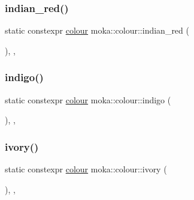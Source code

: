 \mbox{\label{classmoka_1_1colour_a808f0790d09569dfa2536ebc91a189c1}} 
\subsubsection{\texorpdfstring{indian\_red()}{indian\_red()}}
{\footnotesize\ttfamily static constexpr \mbox{\hyperlink{classmoka_1_1colour}{colour}} moka\+::colour\+::indian\+\_\+red (\begin{DoxyParamCaption}{ }\end{DoxyParamCaption})\hspace{0.3cm}{\ttfamily [inline]}, {\ttfamily [static]}, {\ttfamily [noexcept]}}

\mbox{\label{classmoka_1_1colour_a1654854532d2dd5af3143edaaf95a5ca}} 
\subsubsection{\texorpdfstring{indigo()}{indigo()}}
{\footnotesize\ttfamily static constexpr \mbox{\hyperlink{classmoka_1_1colour}{colour}} moka\+::colour\+::indigo (\begin{DoxyParamCaption}{ }\end{DoxyParamCaption})\hspace{0.3cm}{\ttfamily [inline]}, {\ttfamily [static]}, {\ttfamily [noexcept]}}

\mbox{\label{classmoka_1_1colour_a89c362959da67bdb0900b26966611ecf}} 
\subsubsection{\texorpdfstring{ivory()}{ivory()}}
{\footnotesize\ttfamily static constexpr \mbox{\hyperlink{classmoka_1_1colour}{colour}} moka\+::colour\+::ivory (\begin{DoxyParamCaption}{ }\end{DoxyParamCaption})\hspace{0.3cm}{\ttfamily [inline]}, {\ttfamily [static]}, {\ttfamily [noexcept]}}

